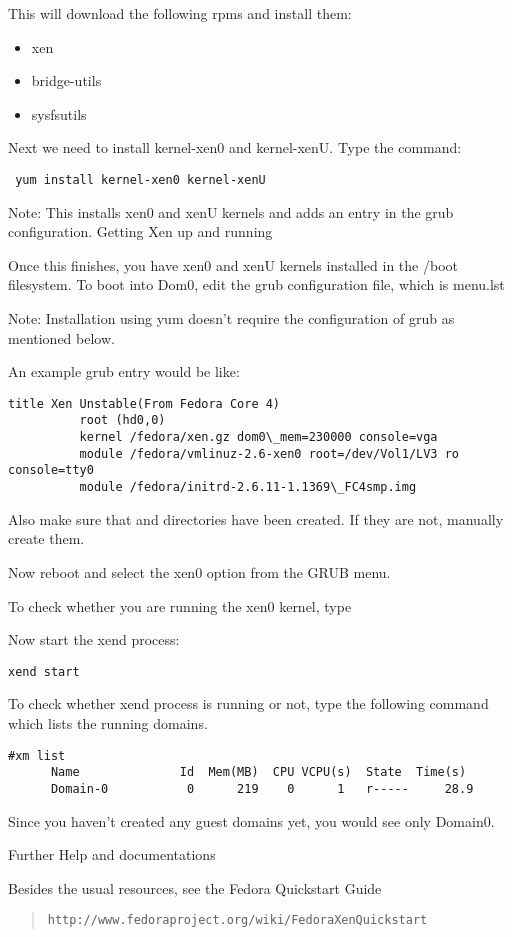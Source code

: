 This will download the following rpms and install them:

\begin{itemize}
\item xen
\item bridge-utils
\item sysfsutils
\end{itemize}

Next we need to install kernel-xen0 and kernel-xenU. Type the command:

\begin{verbatim}
 yum install kernel-xen0 kernel-xenU 
\end{verbatim}

Note: This installs xen0 and xenU kernels and adds an entry in the grub configuration.
Getting Xen up and running

Once this finishes, you have xen0 and xenU kernels installed in the /boot filesystem. To boot into Dom0, edit the grub configuration file, which is menu.lst

Note: Installation using yum doesn't require the configuration of grub as mentioned below.

An example grub entry would be like:

{\small
\begin{verbatim}
title Xen Unstable(From Fedora Core 4)
          root (hd0,0)
          kernel /fedora/xen.gz dom0\_mem=230000 console=vga
          module /fedora/vmlinuz-2.6-xen0 root=/dev/Vol1/LV3 ro console=tty0
          module /fedora/initrd-2.6.11-1.1369\_FC4smp.img
\end{verbatim}
}

Also make sure that  and  directories have been created. If they are not, manually create them.

Now reboot and select the xen0 option from the GRUB menu.

To check whether you are running the xen0 kernel, type 

Now start the xend process:

\begin{verbatim}
xend start
\end{verbatim}

To check whether xend process is running or not, type the following command which lists the running domains.

\begin{verbatim}
#xm list
      Name              Id  Mem(MB)  CPU VCPU(s)  State  Time(s)
      Domain-0           0      219    0      1   r-----     28.9
\end{verbatim}

Since you haven't created any guest domains yet, you would see only Domain0.

Further Help and documentations

Besides the usual resources, see the Fedora Quickstart Guide \begin{quote} {\tt http://www.fedoraproject.org/wiki/FedoraXenQuickstart } \end{quote}
